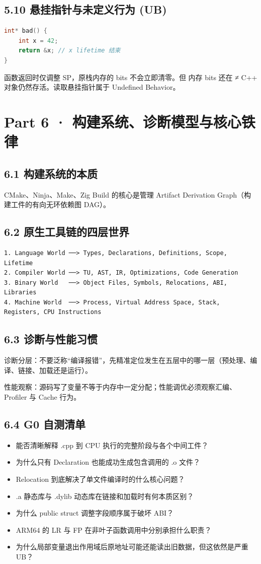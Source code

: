\documentclass[11pt,a4paper]{article}
\begin{document}
\subsection{5.10 悬挂指针与未定义行为 (UB)}
\begin{lstlisting}[language=cpp]
int* bad() {
    int x = 42;
    return &x; // x lifetime 结束
}
\end{lstlisting}
函数返回时仅调整 SP，原栈内存的 bits 不会立即清零。但 内存 bits 还在 ≠ C++ 对象仍然存活。读取悬挂指针属于 Undefined Behavior。

\section{Part 6 · 构建系统、诊断模型与核心铁律}
\subsection{6.1 构建系统的本质}
CMake、Ninja、Make、Zig Build 的核心是管理 Artifact Derivation Graph（构建工件的有向无环依赖图 DAG）。

\subsection{6.2 原生工具链的四层世界}
\begin{lstlisting}[language=text]
1. Language World ──> Types, Declarations, Definitions, Scope, Lifetime
2. Compiler World ──> TU, AST, IR, Optimizations, Code Generation
3. Binary World   ──> Object Files, Symbols, Relocations, ABI, Libraries
4. Machine World  ──> Process, Virtual Address Space, Stack, Registers, CPU Instructions
\end{lstlisting}
\subsection{6.3 诊断与性能习惯}
诊断分层：不要泛称“编译报错”，先精准定位发生在五层中的哪一层（预处理、编译、链接、加载还是运行）。

性能观察：源码写了变量不等于内存中一定分配；性能调优必须观察汇编、Profiler 与 Cache 行为。

\subsection{6.4 G0 自测清单}
\begin{itemize}
	\item 能否清晰解释 .cpp 到 CPU 执行的完整阶段与各个中间工件？
	\item 为什么只有 Declaration 也能成功生成包含调用的 .o 文件？
	\item Relocation 到底解决了单文件编译时的什么核心问题？
	\item .a 静态库与 .dylib 动态库在链接和加载时有何本质区别？
	\item 为什么 public struct 调整字段顺序属于破坏 ABI？
	\item ARM64 的 LR 与 FP 在非叶子函数调用中分别承担什么职责？
	\item 为什么局部变量退出作用域后原地址可能还能读出旧数据，但这依然是严重 UB？
\end{itemize}
\end{document}
